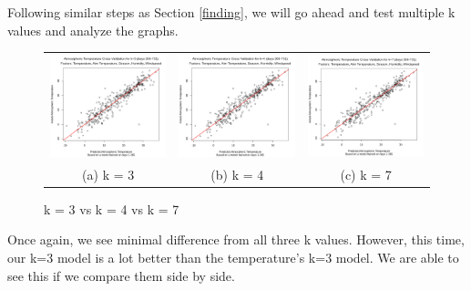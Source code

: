 \documentclass[12pt]{article}
\begin{document}
Following similar steps as Section \ref{finding}, we will go ahead and test multiple k values and analyze the graphs.

\begin{figure}[H]
\begin{tabular}{ccc}
  \includegraphics[width=.33\linewidth]{atempwindhumk=3.png} &  
  \includegraphics[width=.33\linewidth]{atempwindhumk=4.png} &   \includegraphics[width=.33\linewidth]{atempwindhumk=7.png} \\
(a) k = 3 & (b) k = 4 & (c) k = 7\\[6pt]
\end{tabular}
\caption{k = 3 vs k = 4 vs k = 7}
\label{atemphumresult}
\end{figure}

Once again, we see minimal difference from all three k values. However, this time, our k=3 model is a lot better than the temperature's k=3 model. We are able to see this if we compare them side by side.
\end{document}
